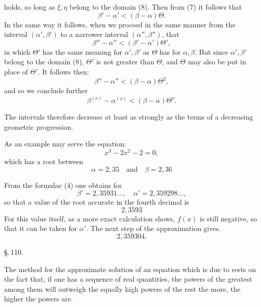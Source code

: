 holds, so long as $\xi, \eta$ belong to the domain (8). Then from (7) it follows that
\[
\beta' - \alpha' < (\beta - \alpha)\Theta.
\]
In the same way it follows, when we proceed in the same manner from the interval $(\alpha', \beta')$ to a narrower interval $(\alpha'', \beta'')$, that
\[
\beta'' - \alpha'' < (\beta' - \alpha')\Theta',
\]
in which $\Theta'$ has the same meaning for $\alpha', \beta'$ as $\Theta$ has for $\alpha, \beta$. But since $\alpha', \beta'$ belong to the domain (8), $\Theta'$ is not greater than $\Theta$, and $\Theta$ may also be put in place of $\Theta'$. It follows then:
\[
\beta'' - \alpha'' < (\beta - \alpha)\Theta^2,
\]
and so we conclude further
\[
\beta^{(\nu)} - \alpha^{(\nu)} < (\beta - \alpha)\Theta^\nu.
\]

The intervals therefore decrease at least as strongly as the terms of a decreasing geometric progression.

As an example may serve the equation:
\[
x^3 - 2x^2 - 2 = 0,
\]
which has a root between
\[
\alpha = 2{,}35 \quad \text{and} \quad \beta = 2{,}36
\]

From the formulae (4) one obtains for
\[
\beta' = 2{,}35931\ldots, \quad \alpha' = 2{,}359298\ldots,
\]
so that a value of the root accurate in the fourth decimal is
\[
2{,}3593
\]
For this value itself, as a more exact calculation shows, $f(x)$ is still negative, so that it can be taken for $\alpha'$. The next step of the approximation gives.
\[
2{,}359304.
\]

\begin{center}
\S.\,110.

\end{center}

The method for the approximate solution of an equation which is due to  rests on the fact that, if one has a sequence of real quantities, the powers of the greatest among them will outweigh the equally high powers of the rest the more, the higher the powers are.
